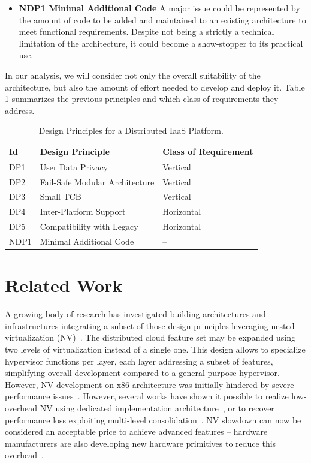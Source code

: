 \documentclass{sig-alternate}
\begin{document}
\begin{itemize}[]
\item \textbf{NDP1 Minimal Additional Code} A major issue could be represented by the amount of code to be added and maintained to an existing architecture to meet functional requirements. Despite not being a strictly a technical limitation of the architecture, it could become a show-stopper to its practical use.
\end{itemize}
In our analysis, we will consider not only the overall suitability of the architecture, but also the amount of effort needed to develop and deploy it. Table \ref{int:des} summarizes the previous principles and which class of requirements they address.
 
\begin{table}
\caption{Design Principles for a Distributed IaaS Platform.\label{int:des}}
\begin{tabular}{lll}
\toprule
\textbf{Id} & \textbf{Design Principle} & \textbf{Class of Requirement} \\
\midrule
DP1 & User Data Privacy & Vertical \\
DP2 & Fail-Safe Modular Architecture & Vertical \\ 
DP3 & Small TCB & Vertical \\
DP4 & Inter-Platform Support & Horizontal \\
DP5 & Compatibility with Legacy & Horizontal \\
NDP1 & Minimal Additional Code & -- \\
\bottomrule
\end{tabular}
\end{table}
 
\section{Related Work}
\label{sec:rw}

\noindent A growing body of research has investigated building architectures and infrastructures integrating a subset of those design principles leveraging nested virtualization (NV)~\cite{turtle:ibm,art:blan, cloudvisor:zhang, Inception, hvx:usenix}. The distributed cloud feature set may be expanded using two levels of virtualization instead of a single one. This design allows to specialize hypervisor functions per layer, each layer addressing a subset of features, simplifying overall development compared to a general-purpose hypervisor. However, NV development on x86 architecture was initially hindered by severe performance issues~\cite{rec:virt}.
However, several works have shown it possible to realize low-overhead NV using dedicated implementation architecture~\cite{turtle:ibm}, or to recover performance loss exploiting multi-level consolidation~\cite{art:blan}. NV slowdown can now be considered an acceptable price to achieve advanced features -- hardware manufacturers are also developing new hardware primitives to reduce this overhead~\cite{vmcs:nakajima}.
\end{document}
